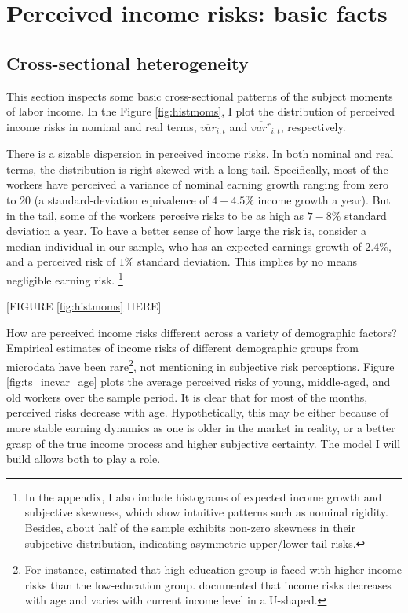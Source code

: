 \documentclass[12pt,notitlepage,onecolumn,aps,pra]{article}
\begin{document}
    \hypertarget{perceived-income-risks-basic-facts}{%
\section{Perceived income risks: basic
facts}\label{perceived-income-risks-basic-facts}}

\hypertarget{cross-sectional-heterogeneity}{%
\subsection{Cross-sectional
heterogeneity}\label{cross-sectional-heterogeneity}}

This section inspects some basic cross-sectional patterns of the subject
moments of labor income. In the Figure \ref{fig:histmoms}, I plot the
distribution of perceived income risks in nominal and real terms,
\(\overline{var}_{i,t}\) and \(\overline{var^{r}}_{i,t}\), respectively.

There is a sizable dispersion in perceived income risks. In both nominal
and real terms, the distribution is right-skewed with a long tail.
Specifically, most of the workers have perceived a variance of nominal
earning growth ranging from zero to \(20\) (a standard-deviation
equivalence of \(4-4.5\%\) income growth a year). But in the tail, some
of the workers perceive risks to be as high as \(7-8\%\) standard
deviation a year. To have a better sense of how large the risk is,
consider a median individual in our sample, who has an expected earnings
growth of \(2.4\%\), and a perceived risk of \(1\%\) standard deviation.
This implies by no means negligible earning risk.
\footnote{In the appendix, I also include histograms of expected income growth and subjective skewness, which show intuitive patterns such as nominal rigidity. Besides, about half of the sample exhibits non-zero skewness in their subjective distribution, indicating asymmetric upper/lower tail risks.}

{[}FIGURE \ref{fig:histmoms} HERE{]}

How are perceived income risks different across a variety of demographic
factors? Empirical estimates of income risks of different demographic
groups from microdata have been
rare\footnote{For instance, \cite{meghir2004income} estimated that high-education group is faced with higher income risks than the low-education group.  \cite{bloom2018great} documented that income risks decreases with age and varies with current income level in a U-shaped.},
not mentioning in subjective risk perceptions. Figure
\ref{fig:ts_incvar_age} plots the average perceived risks of young,
middle-aged, and old workers over the sample period. It is clear that
for most of the months, perceived risks decrease with age.
Hypothetically, this may be either because of more stable earning
dynamics as one is older in the market in reality, or a better grasp of
the true income process and higher subjective certainty. The model I
will build allows both to play a role.
\end{document}
